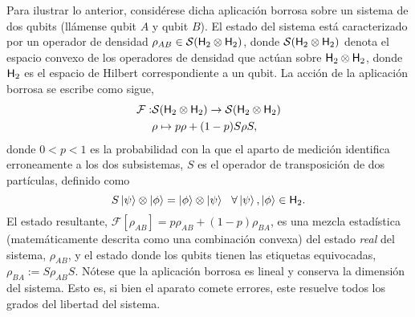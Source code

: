 \documentclass[onecolumn,10pt]{article}
\newcommand{\mcS}{\mathcal{S}}
\newcommand{\hilbert}{{\sf H}}
\newcommand{\mcF}{\mathcal{F}}
\newcommand{\Fuzzy}[1]{\mcF\left[#1\right]}
\begin{document}
Para ilustrar lo anterior, considérese dicha aplicación borrosa sobre un sistema de dos qubits (llámense qubit $A$ y qubit $B$). El estado del sistema está caracterizado por un operador de densidad $\rho_{AB} \in \mcS(\hilbert_2 \otimes \hilbert_2)$, donde $\mcS(\hilbert_2 \otimes \hilbert_2)$ denota el espacio convexo de los operadores de densidad que actúan sobre $\hilbert_2 \otimes \hilbert_2$, donde $\hilbert_2$ es el espacio de Hilbert correspondiente a un qubit. La acción de la aplicación borrosa se escribe como sigue,
\begin{align}
\mcF:&\mcS(\hilbert_2 \otimes \hilbert_2)\to \mcS(\hilbert_2 \otimes \hilbert_2)\nonumber\\
&\rho \mapsto p\rho+(1-p)S\rho S\label{eq:Fuzzy2},
\end{align}
donde $0<p<1$ es la probabilidad con la que el aparto de medición identifica erroneamente a los dos subsistemas, $S$ es el operador de transposición de dos partículas, definido como 
$$S\ket{\psi}\otimes \ket{\phi}=\ket{\phi}\otimes \ket{\psi} \ \ \forall \ket{\psi},\ket{\phi}\in \hilbert_2.$$
%
El estado resultante, $\Fuzzy{\rho_{AB}}=p\rho_{AB}+(1-p)\rho_{BA}$, es una mezcla estadística (matemáticamente descrita como una combinación convexa) del estado \textit{real} del sistema, $\rho_{AB}$, y el estado donde los qubits tienen las etiquetas equivocadas, $\rho_{BA}:=S\rho_{AB} S$. Nótese que la aplicación borrosa es lineal y conserva la dimensión del sistema. Esto es, si bien el aparato comete errores, este resuelve todos los grados del libertad del sistema.
\end{document}
